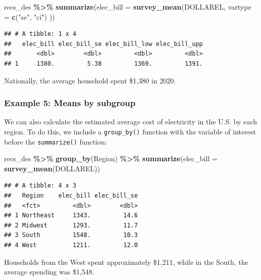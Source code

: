 \documentclass[
]{krantz}
\makeatletter
\newenvironment{Shaded}{\begin{snugshade}}{\end{snugshade}}
\newcommand{\AttributeTok}[1]{\textcolor[rgb]{0.27,0.27,0.27}{#1}}
\newcommand{\FunctionTok}[1]{\textcolor[rgb]{0.27,0.27,0.27}{\textbf{#1}}}
\newcommand{\NormalTok}[1]{#1}
\newcommand{\SpecialCharTok}[1]{\textcolor[rgb]{0.43,0.43,0.43}{\textbf{#1}}}
\newcommand{\StringTok}[1]{\textcolor[rgb]{0.5,0.5,0.5}{#1}}
\newenvironment{kframe}{%
\medskip{}
\setlength{\fboxsep}{.8em}
 \def\at@end@of@kframe{}%
 \ifinner\ifhmode%
  \def\at@end@of@kframe{\end{minipage}}%
  \begin{minipage}{\columnwidth}%
 \fi\fi%
 \def\FrameCommand##1{\hskip\@totalleftmargin \hskip-\fboxsep
 \colorbox{shadecolor}{##1}\hskip-\fboxsep
     \hskip-\linewidth \hskip-\@totalleftmargin \hskip\columnwidth}%
 \MakeFramed {\advance\hsize-\width
   \@totalleftmargin\z@ \linewidth\hsize
   \@setminipage}}%
 {\par\unskip\endMakeFramed%
 \at@end@of@kframe}
\renewenvironment{Shaded}{\begin{kframe}}{\end{kframe}}
\makeatother
\begin{document}
\begin{Shaded}
\begin{Highlighting}[]
\NormalTok{recs\_des }\SpecialCharTok{\%\textgreater{}\%}
  \FunctionTok{summarize}\NormalTok{(}\AttributeTok{elec\_bill =} \FunctionTok{survey\_mean}\NormalTok{(DOLLAREL,}
    \AttributeTok{vartype =} \FunctionTok{c}\NormalTok{(}\StringTok{"se"}\NormalTok{, }\StringTok{"ci"}\NormalTok{)}
\NormalTok{  ))}
\end{Highlighting}
\end{Shaded}

\begin{verbatim}
## # A tibble: 1 x 4
##   elec_bill elec_bill_se elec_bill_low elec_bill_upp
##       <dbl>        <dbl>         <dbl>         <dbl>
## 1     1380.         5.38         1369.         1391.
\end{verbatim}

Nationally, the average household spent \$1,380 in 2020.

\hypertarget{example-5-means-by-subgroup}{%
\subsubsection*{Example 5: Means by subgroup}\label{example-5-means-by-subgroup}}


We can also calculate the estimated average cost of electricity in the U.S. by each region. To do this, we include a \texttt{group\_by()} function with the variable of interest before the \texttt{summarize()} function:

\begin{Shaded}
\begin{Highlighting}[]
\NormalTok{recs\_des }\SpecialCharTok{\%\textgreater{}\%}
  \FunctionTok{group\_by}\NormalTok{(Region) }\SpecialCharTok{\%\textgreater{}\%}
  \FunctionTok{summarize}\NormalTok{(}\AttributeTok{elec\_bill =} \FunctionTok{survey\_mean}\NormalTok{(DOLLAREL))}
\end{Highlighting}
\end{Shaded}

\begin{verbatim}
## # A tibble: 4 x 3
##   Region    elec_bill elec_bill_se
##   <fct>         <dbl>        <dbl>
## 1 Northeast     1343.         14.6
## 2 Midwest       1293.         11.7
## 3 South         1548.         10.3
## 4 West          1211.         12.0
\end{verbatim}

Households from the West spent approximately \$1,211, while in the South, the average spending was \$1,548.
\end{document}
